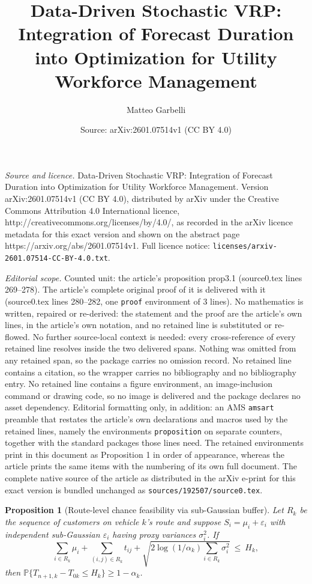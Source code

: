 \documentclass[10pt,a4paper]{amsart}
\title{Data-Driven Stochastic VRP: Integration of Forecast Duration into Optimization for Utility Workforce Management}
\author{Matteo Garbelli}
\date{Source: arXiv:2601.07514v1 (CC BY 4.0)}
\newtheorem{proposition}{Proposition}
\begin{document}
\maketitle

\noindent\emph{Source and licence.} Data-Driven Stochastic VRP: Integration of Forecast Duration into Optimization for Utility Workforce Management. Version arXiv:2601.07514v1 (CC BY 4.0), distributed by arXiv under the Creative Commons Attribution 4.0 International licence, http://creativecommons.org/licenses/by/4.0/, as recorded in the arXiv licence metadata for this exact version and shown on the abstract page https://arxiv.org/abs/2601.07514v1. Full licence notice: \texttt{licenses/arxiv-2601.07514-CC-BY-4.0.txt}.\par\smallskip

\noindent\textit{Editorial scope.} Counted unit: the article's proposition prop3.1 (source0.tex lines 269--278). The article's complete original proof of it is delivered with it (source0.tex lines 280--282, one \texttt{proof} environment of 3 lines). No mathematics is written, repaired or re-derived: the statement and the proof are the article's own lines, in the article's own notation, and no retained line is substituted or re-flowed.  No further source-local context is needed: every cross-reference of every retained line resolves inside the two delivered spans.  Nothing was omitted from any retained span, so the package carries no omission record.  No retained line contains a citation, so the wrapper carries no bibliography and no bibliography entry.  No retained line contains a figure environment, an image-inclusion command or drawing code, so no image is delivered and the package declares no asset dependency.  Editorial formatting only, in addition: an AMS \texttt{amsart} preamble that restates the article's own declarations and macros used by the retained lines, namely the environments \texttt{proposition} on separate counters, together with the standard packages those lines need.  The retained environments print in this document as Proposition 1 in order of appearance, whereas the article prints the same items with the numbering of its own full document.  The complete native source of the article as distributed in the arXiv e-print for this exact version is bundled unchanged as \texttt{sources/192507/source0.tex}.
\begin{proposition}[Route-level chance feasibility via sub-Gaussian buffer]
\label{prop3.1}
Let $R_k$ be the sequence of customers on vehicle $k$'s route and suppose $S_i=\mu_i+\varepsilon_i$ with independent sub-Gaussian $\varepsilon_i$ having proxy variances $\sigma_i^2$. If
\[
\sum_{i\in R_k}\mu_i + \sum_{(i,j)\in R_k} t_{ij}
+ \sqrt{2\log(1/\alpha_k)\sum_{i\in R_k}\sigma_i^2}
\ \le\ H_k,
\]
then $\mathbb{P}\{T_{n+1,k}-T_{0k} \le H_k\}\ge 1-\alpha_k$.
\end{proposition}
\end{document}
